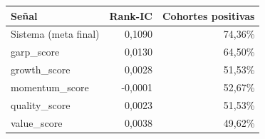 \begin{tabular}{lrr}
\toprule
Señal & Rank-IC & Cohortes positivas \\
\midrule
Sistema (meta final) & 0,1090 & 74,36\% \\
garp\_score & 0,0130 & 64,50\% \\
growth\_score & 0,0028 & 51,53\% \\
momentum\_score & -0,0001 & 52,67\% \\
quality\_score & 0,0023 & 51,53\% \\
value\_score & 0,0038 & 49,62\% \\
\bottomrule
\end{tabular}
